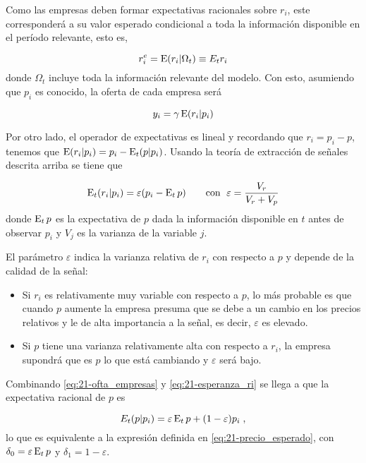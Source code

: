 \documentclass[DeGregorioResumen]{subfiles}
\begin{document}
Como las empresas deben formar expectativas racionales sobre $r_i$, este corresponderá a su valor esperado condicional a toda la información disponible en el período relevante, esto es, 

\begin{equation*}
	r^e_i = \operatorname{E}(r_i|\Omega_t) \equiv E_t r_i
\end{equation*}
donde $\Omega_t$ incluye toda la información relevante del modelo. Con esto, asumiendo que $p_i$ es conocido, la oferta de cada empresa será

\begin{equation}
	y_i = \gamma \operatorname{E}(r_i|p_i)
	\label{eq:21-ofta_empresas}
\end{equation}

Por otro lado, el operador de expectativas es lineal y recordando que $r_i=p_i-p$, tenemos que $\operatorname{E}(r_i|p_i)=p_i-\operatorname{E}_t(p|p_i)$. Usando la teoría de extracción de señales descrita arriba se tiene que

\begin{equation}
	\operatorname{E}_t(r_i|p_i) = \varepsilon(p_i-\operatorname{E}_t p) \qquad \text{con }\; \varepsilon = \frac{V_r}{V_r+V_p}
	\label{eq:21-esperanza_ri}
\end{equation}
donde $\operatorname{E}_t p$ es la expectativa de $p$ dada la información disponible en $t$ antes de observar $p_i$ y $V_j$ es la varianza de la variable $j$.

El parámetro $\varepsilon$ indica la varianza relativa de $r_i$ con respecto a $p$ y depende de la calidad de la señal:

\begin{itemize}
	\item Si $r_i$ es relativamente muy variable con respecto a $p$, lo más probable es que cuando $p$ aumente la empresa presuma que se debe a un cambio en los precios relativos y le de alta importancia a la señal, es decir, $\varepsilon$ es elevado.
	\item Si $p$ tiene una varianza relativamente alta con respecto a $r_i$, la empresa supondrá que es $p$ lo que está cambiando y $\varepsilon$ será bajo.
\end{itemize}

Combinando \eqref{eq:21-ofta_empresas} y \eqref{eq:21-esperanza_ri} se llega a que la expectativa racional de $p$ es

\begin{equation}
	E_t (p|p_i) = \varepsilon \operatorname{E}_t p + (1-\varepsilon)p_i \;,
	\label{eq:21-expectativa_racional_p}
\end{equation}
lo que es equivalente a la expresión definida en \eqref{eq:21-precio_esperado}, con $\delta_0=\varepsilon \operatorname{E}_t p$ y $\delta_1=1-\varepsilon$.
\end{document}
